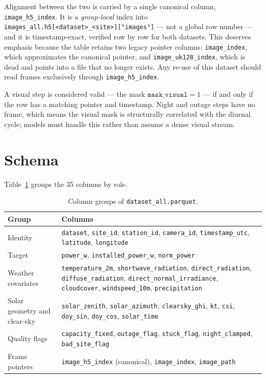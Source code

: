Alignment between the two is carried by a single canonical column,
\texttt{image\_h5\_index}. It is a \emph{group-local} index into
\texttt{images\_all.h5[<dataset>\_<site>]["images"]} --- not a global row number --- and it
is timestamp-exact, verified row by row for both datasets. This deserves emphasis because
the table retains two legacy pointer columns: \texttt{image\_index}, which approximates the
canonical pointer, and \texttt{image\_uk128\_index}, which is dead and points into a file
that no longer exists. Any re-use of this dataset should read frames exclusively through
\texttt{image\_h5\_index}.

A visual step is considered valid --- the mask $\texttt{mask\_visual}=1$ --- if and only if
the row has a matching pointer and timestamp. Night and outage steps have no frame, which
means the visual mask is structurally correlated with the diurnal cycle; models must handle
this rather than assume a dense visual stream.

\section{Schema}
\label{sec:schema}

Table~\ref{tab:schema} groups the 35 columns by role.

\begin{table}[h!]
\centering
\small
\begin{tabular}{p{3.0cm} p{10.5cm}}
\hline
\textbf{Group} & \textbf{Columns} \\
\hline
Identity & \texttt{dataset}, \texttt{site\_id}, \texttt{station\_id},
\texttt{camera\_id}, \texttt{timestamp\_utc}, \texttt{latitude}, \texttt{longitude} \\
Target & \texttt{power\_w}, \texttt{installed\_power\_w}, \texttt{norm\_power} \\
Weather covariates & \texttt{temperature\_2m}, \texttt{shortwave\_radiation},
\texttt{direct\_radiation}, \texttt{diffuse\_radiation},
\texttt{direct\_normal\_irradiance}, \texttt{cloudcover}, \texttt{windspeed\_10m},
\texttt{precipitation} \\
Solar geometry and clear-sky & \texttt{solar\_zenith}, \texttt{solar\_azimuth},
\texttt{clearsky\_ghi}, \texttt{kt}, \texttt{csi}, \texttt{doy\_sin}, \texttt{doy\_cos},
\texttt{solar\_time} \\
Quality flags & \texttt{capacity\_fixed}, \texttt{outage\_flag}, \texttt{stuck\_flag},
\texttt{night\_clamped}, \texttt{bad\_site\_flag} \\
Frame pointers & \texttt{image\_h5\_index} (canonical), \texttt{image\_index},
\texttt{image\_path} \\
\hline
\end{tabular}
\caption{Column groups of \texttt{dataset\_all.parquet}.}
\label{tab:schema}
\end{table}

